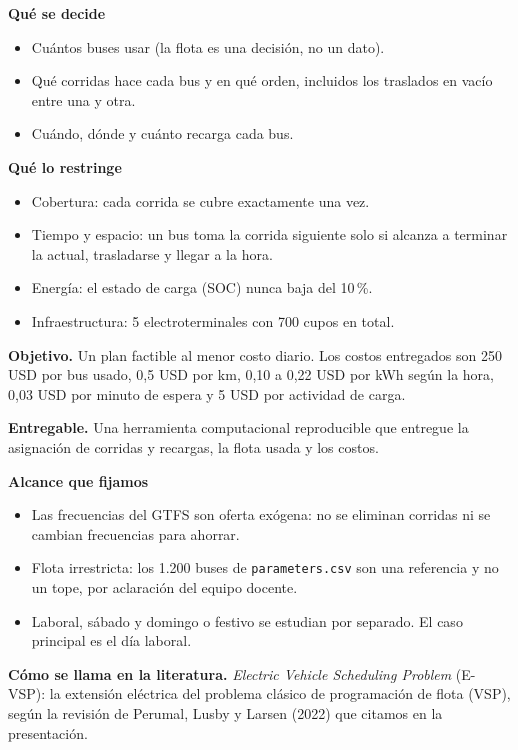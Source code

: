 \documentclass[11pt,a4paper,parskip=half]{scrartcl}
\newcommand{\arch}[1]{\texttt{#1}}
\begin{document}
\begin{minipage}[t]{0.48\linewidth}
\textbf{Qué se decide}
\begin{itemize}
  \item Cuántos buses usar (la flota es una decisión, no un dato).
  \item Qué corridas hace cada bus y en qué orden, incluidos los traslados en vacío entre una y otra.
  \item Cuándo, dónde y cuánto recarga cada bus.
\end{itemize}
\end{minipage}\hfill
\begin{minipage}[t]{0.48\linewidth}
\textbf{Qué lo restringe}
\begin{itemize}
  \item Cobertura: cada corrida se cubre exactamente una vez.
  \item Tiempo y espacio: un bus toma la corrida siguiente solo si alcanza a terminar la actual, trasladarse y llegar a la hora.
  \item Energía: el estado de carga (SOC) nunca baja del 10\,\%.
  \item Infraestructura: 5 electroterminales con 700 cupos en total.
\end{itemize}
\end{minipage}

\textbf{Objetivo.} Un plan factible al menor costo diario. Los costos entregados son 250 USD por bus usado, 0,5 USD por km, 0,10 a 0,22 USD por kWh según la hora, 0,03 USD por minuto de espera y 5 USD por actividad de carga.

\textbf{Entregable.} Una herramienta computacional reproducible que entregue la asignación de corridas y recargas, la flota usada y los costos.

\textbf{Alcance que fijamos}
\begin{itemize}
  \item Las frecuencias del GTFS son oferta exógena: no se eliminan corridas ni se cambian frecuencias para ahorrar.
  \item Flota irrestricta: los 1.200 buses de \arch{parameters.csv} son una referencia y no un tope, por aclaración del equipo docente.
  \item Laboral, sábado y domingo o festivo se estudian por separado. El caso principal es el día laboral.
\end{itemize}

\textbf{Cómo se llama en la literatura.} \emph{Electric Vehicle Scheduling Problem} (E-VSP): la extensión eléctrica del problema clásico de programación de flota (VSP), según la revisión de Perumal, Lusby y Larsen (2022) que citamos en la presentación.
\end{document}
